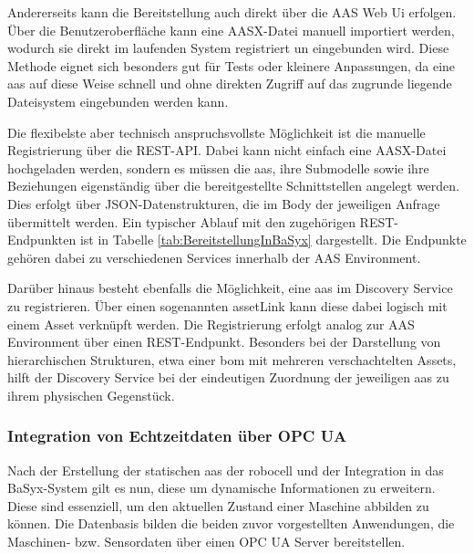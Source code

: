 Andererseits kann die Bereitstellung auch direkt über die AAS Web Ui erfolgen.
Über die Benutzeroberfläche kann eine AASX-Datei manuell importiert werden, wodurch sie direkt im laufenden System registriert un eingebunden wird.
Diese Methode eignet sich besonders gut für Tests oder kleinere Anpassungen, da eine \acs{aas} auf diese Weise schnell und ohne direkten Zugriff auf das zugrunde liegende Dateisystem eingebunden werden kann.

Die flexibelste aber technisch anspruchsvollste Möglichkeit ist die manuelle Registrierung über die REST-API. 
Dabei kann nicht einfach eine AASX-Datei hochgeladen werden, sondern es müssen die \acs{aas}, ihre Submodelle sowie ihre Beziehungen eigenständig über die bereitgestellte Schnittstellen angelegt werden.
Dies erfolgt über JSON-Datenstrukturen, die im Body der jeweiligen Anfrage übermittelt werden.
Ein typischer Ablauf mit den zugehörigen REST-Endpunkten ist in Tabelle \ref{tab:BereitstellungInBaSyx} dargestellt.
Die Endpunkte gehören dabei zu verschiedenen Services innerhalb der AAS Environment.



Darüber hinaus besteht ebenfalls die Möglichkeit, eine \acs{aas} im Discovery Service zu registrieren.
Über einen sogenannten assetLink kann diese dabei logisch mit einem Asset verknüpft werden.
Die Registrierung erfolgt analog zur AAS Environment über einen REST-Endpunkt.
Besonders bei der Darstellung von hierarchischen Strukturen, etwa einer \acs{bom} mit mehreren verschachtelten Assets, hilft der Discovery Service bei der eindeutigen Zuordnung der jeweiligen \acs{aas} zu ihrem physischen Gegenstück.

\newpage
\subsubsection{Integration von Echtzeitdaten über OPC UA}
Nach der Erstellung der statischen \acs{aas} der robocell und der Integration in das BaSyx-System gilt es nun, diese um dynamische Informationen zu erweitern.
Diese sind essenziell, um den aktuellen Zustand einer Maschine abbilden zu können.
Die Datenbasis bilden die beiden zuvor vorgestellten Anwendungen, die Maschinen- bzw. Sensordaten über einen OPC UA Server bereitstellen.

